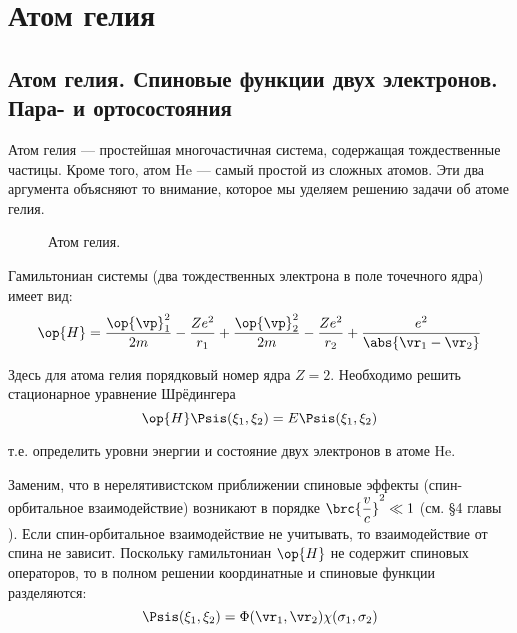 \chapter{Атом гелия}

\section{Атом гелия. Спиновые функции двух электронов. Пара- и ортосостояния}

Атом гелия --- простейшая многочастичная система, содержащая тождественные частицы. Кроме того, атом He --- самый простой из сложных атомов. Эти два аргумента объясняют то внимание, которое мы уделяем решению задачи об атоме гелия.
\begin{figure}[h!]
\centering
{}
\caption{Атом гелия.} \label{fig:17_1}
\end{figure}

Гамильтониан системы (два тождественных электрона в поле точечного ядра) имеет вид:
\begin{equation}
\label{eq:17_1_1}
\op{H} = \frac{\op{\vp}_1^2}{2m} - \frac{Ze^2}{r_1} + \frac{\op{\vp}_2^2}{2m} - \frac{Ze^2}{r_2} + \frac{e^2}{\abs{\vr_1 - \vr_2}}
\end{equation}

Здесь для атома гелия порядковый номер ядра $Z = 2$. Необходимо решить стационарное уравнение Шрёдингера
\begin{equation}
\label{eq:17_1_2}
\op{H} \Psis(\xi_1, \xi_2) =E\Psis(\xi_1, \xi_2)
\end{equation}

т.е. определить уровни энергии и состояние двух электронов в атоме He.

Заменим, что в нерелятивистском приближении спиновые эффекты (спин-орбитальное взаимодействие) возникают в порядке $\brc{\dfrac{v}{c}}^2 \ll 1$ (см. \S 4 главы ). Если спин-орбитальное взаимодействие не учитывать, то взаимодействие от спина не зависит. Поскольку гамильтониан $\op{H}$ не содержит спиновых операторов, то в полном решении координатные и спиновые функции разделяются:
$$
\Psis(\xi_1, \xi_2) = \Phi(\vr_1, \vr_2) \chi(\sigma_1, \sigma_2)
$$

